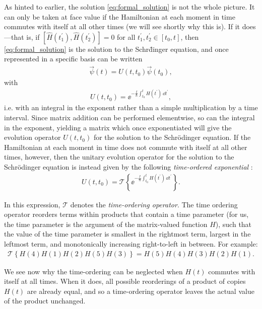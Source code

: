 As hinted to earlier, the solution \eqref{eq:formal_solution} is not the whole picture. It can only be taken at face value if the Hamiltonian at each moment in time commutes with itself at all other times (we will see shortly why this is). If it does---that is, if $[\hat H(t_1^\prime), \hat H(t_2^\prime)] = 0$ for all $t^\prime_1, t^\prime_2 \in [t_0, t]$, then \eqref{eq:formal_solution} is the solution to the Schr\"dinger equation, and once represented in a specific basis can be written
\begin{align}
\vec \psi(t) = U(t, t_0) \vec \psi(t_0),
\end{align}
with
\begin{align}
U(t, t_0) = \ee^{-\frac \ii \hbar \int_{t_0}^t H(t^\prime)\,\dd t^\prime},
\end{align}
i.e. with an integral in the exponent rather than a simple multiplication by a time interval. Since matrix addition can be performed elementwise, so can the integral in the exponent, yielding a matrix which once exponentiated will give the evolution operator $U(t, t_0)$ for the solution to the Schr\"odinger equation. If the Hamiltonian at each moment in time does not commute with itself at all other times, however, then the unitary evolution operator for the solution to the Schr\"odinger equation is instead given by the following \emph{time-ordered exponential} \cite[p.~193]{tannor_introduction_2007}:
\begin{align}\label{eq:time_ordered_exponential}
U(t, t_0) = \mathcal{T}\left\{\ee^{-\frac \ii \hbar \int_{t_0}^t H(t^\prime)\,\dd t^\prime}\right\}.
\end{align}

In this expression, $\mathcal{T}$ denotes the \emph{time-ordering operator}. The time ordering operator reorders terms within products that contain a time parameter (for us, the time parameter is the argument of the matrix-valued function $H$), such that the value of the time parameter is smallest in the rightmost term, largest in the leftmost term, and monotonically increasing right-to-left in between. For example:
\begin{align}
\mathcal{T}\left\{H(4)H(1)H(2)H(5)H(3)\right\} = H(5)H(4)H(3)H(2)H(1).
\end{align}

We see now why the time-ordering can be neglected when $H(t)$ commutes with itself at all times. When it does, all possible reorderings of a product of copies $H(t)$ are already equal, and so a time-ordering operator leaves the actual value of the product unchanged.

